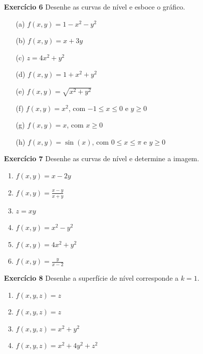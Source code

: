 \begin{enumerate}
    \item[\textbf{Exercício 6}] Desenhe as curvas de nível e esboce o gráfico. 
    \begin{enumerate}
        \item[(a)] $f(x,y) = 1 - x^2 - y^2$ 
        \item[(b)] \(f(x,y) = x + 3y\) 
        \item[(c)] $z = 4x^2 + y^2$
        \item[(d)] \(f(x,y) = 1 + x^2 + y^2\)
        \item[(e)] $f(x,y) = \sqrt{x^2 + y^2}$        
        \item[(f)] \(f(x,y) = x^2\), com \(-1\leq x \leq 0\) e \(y\geq 0\)
        \item[(g)] \(f(x,y) = x\), com \(x\geq 0\)
        \item[(h)] \(f(x,y) = \sin(x)\), com \(0\leq x\leq \pi\) e \(y\geq 0\)
    \end{enumerate}

    \item[\textbf{Exercício 7}] Desenhe as curvas de nível e determine a imagem.
    
        \begin{enumerate}
            \item \(f(x,y) = x - 2y\)
            \item \(f(x,y) = \frac{x-y}{x+y}\)
            \item \(z = xy\)
            \item \(f(x,y) = x^2 - y^2\)
            \item \(f(x,y) = 4x^2 + y^2\)
            \item \(f(x,y) = \frac{y}{x-2}\)
        \end{enumerate}

    \item[\textbf{Exercício 8}] Desenhe a superfície de nível corresponde a \(k=1\).
        
        \begin{enumerate}
            \item \(f(x,y,z) = z\)
            \item \(f(x,y,z) = z\)
            \item \(f(x,y,z) = x^2 + y^2\)
            \item \(f(x,y,z) = x^2 + 4y^2 + z^2\)
        \end{enumerate}
\end{enumerate}